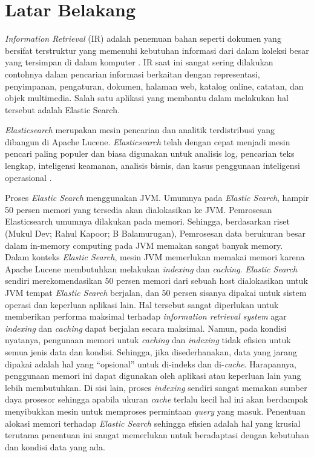 \section{Latar Belakang}

\textit{Information Retrieval} (IR) adalah penemuan bahan seperti dokumen yang bersifat terstruktur yang memenuhi kebutuhan informasi dari dalam koleksi besar yang tersimpan di dalam komputer \parencite{introtoinforetri}. IR saat ini sangat sering dilakukan contohnya dalam pencarian informasi berkaitan dengan representasi, penyimpanan, pengaturan, dokumen, halaman web, katalog online, catatan, dan objek multimedia. Salah satu aplikasi yang membantu dalam melakukan hal tersebut adalah Elastic Search.

\textit{Elasticsearch} merupakan mesin pencarian dan analitik terdistribusi yang dibangun di Apache Lucene. \textit{Elasticsearch} telah dengan cepat menjadi mesin pencari paling populer dan biasa digunakan untuk analisis log, pencarian teks lengkap, inteligensi keamanan, analisis bisnis, dan kasus penggunaan inteligensi operasional \parencite{elasticsearch}.

Proses \textit{Elastic Search} menggunakan JVM. Umumnya pada \textit{Elastic Search}, hampir 50 persen memori yang tersedia akan dialokasikan ke JVM. Pemrosesan Elasticsearch umumnya dilakukan pada memori. Sehingga, berdasarkan riset (Mukul Dev; Rahul Kapoor; B Balamurugan), Pemrosesan data berukuran besar dalam in-memory computing pada JVM memakan sangat banyak memory. Dalam konteks \textit{Elastic Search}, mesin JVM memerlukan memakai memori karena Apache Lucene membutuhkan melakukan \textit{indexing} dan \textit{caching}. \textit{Elastic Search} sendiri merekomendasikan 50 persen memori dari sebuah host dialokasikan untuk JVM tempat \textit{Elastic Search} berjalan, dan 50 persen sisanya dipakai untuk sistem operasi dan keperluan aplikasi lain. Hal tersebut sangat diperlukan untuk memberikan performa maksimal terhadap \textit{information retrieval system} agar \textit{indexing} dan \textit{caching} dapat berjalan secara maksimal. Namun, pada kondisi nyatanya, pengunaan memori untuk \textit{caching} dan \textit{indexing} tidak efisien untuk semua jenis data dan kondisi. Sehingga, jika disederhanakan, data yang jarang dipakai adalah hal yang “opsional” untuk di-indeks dan di-\textit{cache}. Harapannya, penggunaan memori ini dapat digunakan oleh aplikasi atau keperluan lain yang lebih membutuhkan. Di sisi lain, proses \textit{indexing} sendiri sangat memakan sumber daya prosesor sehingga apabila ukuran \textit{cache} terlalu kecil hal ini akan berdampak menyibukkan mesin untuk memproses permintaan \textit{query} yang masuk. Penentuan alokasi memori terhadap \textit{Elastic Search} sehingga efisien adalah hal yang krusial terutama penentuan ini sangat memerlukan untuk beradaptasi dengan kebutuhan dan kondisi data yang ada.



